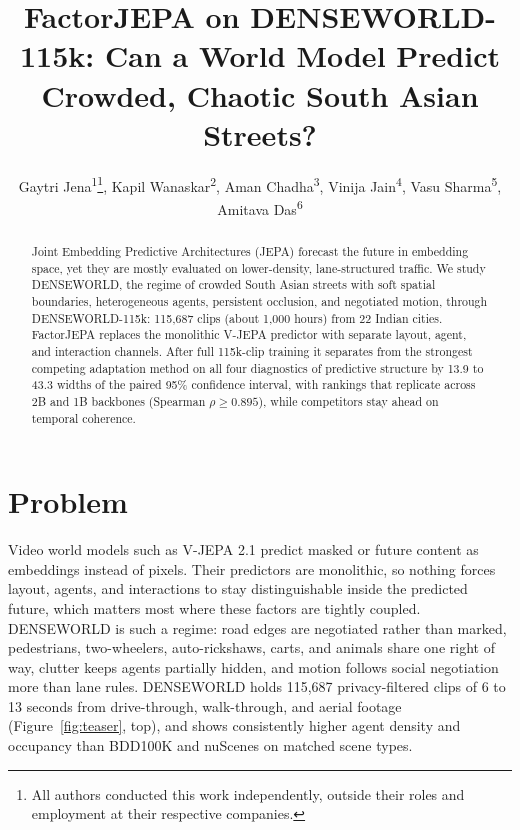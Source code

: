 \documentclass[letterpaper]{article} %
\title{FactorJEPA on DENSEWORLD-115k: Can a World Model Predict Crowded, Chaotic South Asian Streets?}
\author{
    Gaytri Jena\textsuperscript{\rm 1}\thanks{All authors conducted this work independently, outside their roles and employment at their respective companies.},
    Kapil Wanaskar\textsuperscript{\rm 2},
    Aman Chadha\textsuperscript{\rm 3},
    Vini{}ja Jain\textsuperscript{\rm 4},  %
    Vasu Sharma\textsuperscript{\rm 5},
    Amitava Das\textsuperscript{\rm 6}
}
\begin{document}
\maketitle

\begin{abstract}
Joint Embedding Predictive Architectures (JEPA) forecast the future in embedding space, yet they are mostly evaluated on lower-density, lane-structured traffic. We study DENSEWORLD, the regime of crowded South Asian streets with soft spatial boundaries, heterogeneous agents, persistent occlusion, and negotiated motion, through DENSEWORLD-115k: 115,687 clips (about 1,000 hours) from 22 Indian cities. FactorJEPA replaces the monolithic V-JEPA predictor with separate layout, agent, and interaction channels. After full 115k-clip training it separates from the strongest competing adaptation method on all four diagnostics of predictive structure by 13.9 to 43.3 widths of the paired 95\% confidence interval, with rankings that replicate across 2B and 1B backbones (Spearman $\rho \geq 0.895$), while competitors stay ahead on temporal coherence.
\end{abstract}

\begin{links}
\end{links}

\section{Problem}

Video world models such as V-JEPA 2.1 \cite{murlabadia2026vjepa21} predict masked or future content as embeddings instead of pixels. Their predictors are monolithic, so nothing forces layout, agents, and interactions to stay distinguishable inside the predicted future, which matters most where these factors are tightly coupled. DENSEWORLD is such a regime: road edges are negotiated rather than marked, pedestrians, two-wheelers, auto-rickshaws, carts, and animals share one right of way, clutter keeps agents partially hidden, and motion follows social negotiation more than lane rules. DENSEWORLD holds 115,687 privacy-filtered clips of 6 to 13 seconds from drive-through, walk-through, and aerial footage (Figure~\ref{fig:teaser}, top), and shows consistently higher agent density and occupancy than BDD100K and nuScenes on matched scene types.
\end{document}
